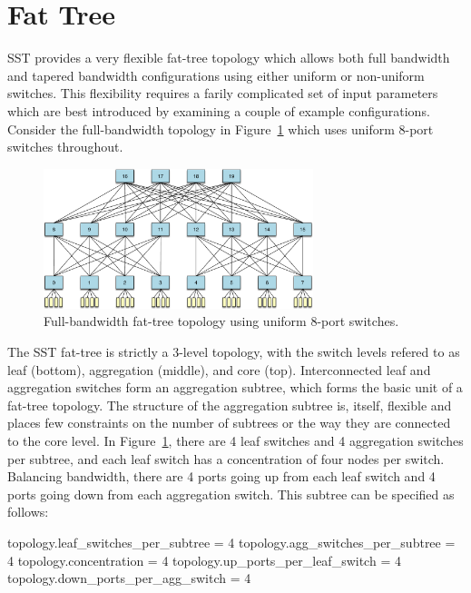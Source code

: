 
\section{Fat Tree}
\label{sec:tutorial:fattree}

SST provides a very flexible fat-tree topology which allows both full bandwidth and tapered bandwidth configurations using either uniform or non-uniform switches.  
This flexibility requires a farily complicated set of input parameters which are best introduced by examining a couple of example configurations.  Consider the full-bandwidth topology in Figure~\ref{fig:topologies:fullfattree} which uses uniform 8-port switches throughout.

\begin{figure}[h!]
\centering
\includegraphics[width=0.7\textwidth]{figures/topologies/fattree4.pdf}
\caption{Full-bandwidth fat-tree topology using uniform 8-port switches.}
\label{fig:topologies:fullfattree}
\end{figure}

The SST fat-tree is strictly a 3-level topology, with the switch levels refered to as leaf (bottom), aggregation (middle), and core (top).
Interconnected leaf and aggregation switches form an aggregation subtree, which forms the basic unit of a fat-tree topology.
The structure of the aggregation subtree is, itself, flexible and places few constraints on the number of subtrees or the way they are connected to the core level.
In Figure~\ref{fig:topologies:fullfattree}, there are 4 leaf switches and 4 aggregation switches per subtree, and each leaf switch has a concentration of four nodes per switch.
Balancing bandwidth, there are 4 ports going up from each leaf switch and 4 ports going down from each aggregation switch.
This subtree can be specified as follows:

\begin{ViFile}
topology.leaf_switches_per_subtree = 4
topology.agg_switches_per_subtree = 4
topology.concentration = 4
topology.up_ports_per_leaf_switch = 4
topology.down_ports_per_agg_switch = 4
\end{ViFile}

